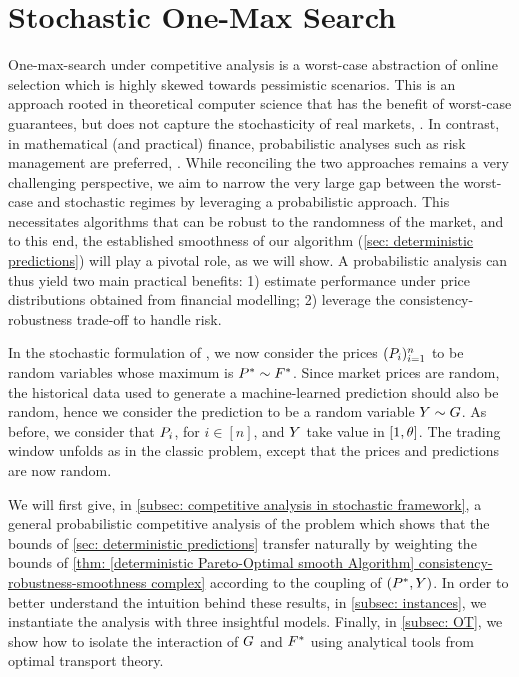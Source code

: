 \section{Stochastic One-Max Search}\label{sec: stochastic predictions}



One-max-search under competitive analysis is a worst-case abstraction of online selection
which is highly skewed towards pessimistic scenarios. This is an approach rooted in theoretical computer science that has the benefit of worst-case guarantees, but does not capture the stochasticity of real markets, \eg \citep{cont_financial_2004,donnelly_optimal_2022}. In contrast,  in mathematical (and practical) finance, probabilistic analyses such as risk management are preferred, \eg \cite{MERTON1975621}.  While reconciling the two approaches remains a very challenging perspective, we aim to narrow the very large gap between the worst-case and stochastic regimes by leveraging a probabilistic approach. This necessitates algorithms that can be robust to the randomness of the market, and to this end, the established smoothness of our algorithm (\cref{sec: deterministic predictions}) will play a pivotal role, as we will show.  A probabilistic analysis can thus yield two main practical benefits: 1) estimate performance under price distributions obtained from financial modelling; 2) leverage the consistency-robustness trade-off to handle risk.


In the stochastic formulation of \OMS{}, we now consider the prices $(P_i)_{i=1}^n$ to be random variables whose maximum is $P^*\sim F^*$. Since market prices are random, the historical data used to generate a machine-learned prediction should also be random, hence we consider the prediction to be a random variable $Y\sim G$. As before, we consider that $P_i$, for $i\in[n]$, and $Y$ take value in $[1,\theta]$. The trading window unfolds as in the classic \OMS{} problem, except that the prices and predictions are now random. 

We will first give, in \cref{subsec: competitive analysis in stochastic framework}, a general probabilistic competitive analysis of the \OMS{} problem which shows that the bounds of \cref{sec: deterministic predictions} transfer naturally by weighting the bounds of \cref{thm: [deterministic Pareto-Optimal smooth Algorithm] consistency-robustness-smoothness complex} according to the coupling of $(P^*,Y)$. In order to better understand the intuition behind these results, in \cref{subsec: instances}, we instantiate the analysis with three insightful models. 
Finally, in \cref{subsec: OT}, we show how to isolate the interaction of $G$ and $F^*$ using analytical tools from optimal transport theory.




